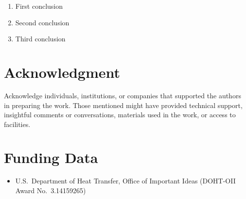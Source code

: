 \documentclass[subscriptcorrection,upint,varvw,mathalfa=cal=euler,barcolor=black,balance,hyphenate,french,pdf-a,nolists]{asmejour}
\begin{document}
\begin{enumerate}
\item First conclusion
\item Second conclusion
\item Third conclusion
\end{enumerate}


\section*{Acknowledgment} %

Acknowledge individuals, institutions, or companies that supported the authors in preparing the work. Those mentioned might have provided technical support, insightful comments or conversations, materials used in the work, or access to facilities.


\section*{Funding Data}
\begin{itemize}
\item U.S.\ Department of Heat Transfer, Office of Important Ideas (DOHT-OII Award No.\ 3.14159265)
\end{itemize}



\begin{nomenclature}





\end{nomenclature}
\end{document}
